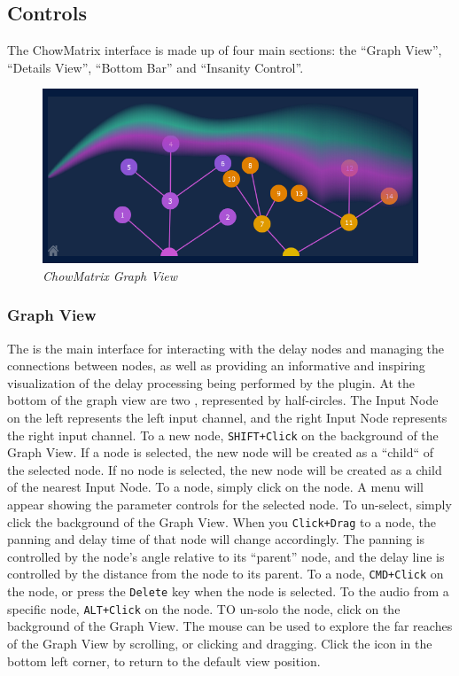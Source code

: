 \documentclass[landscape,twocolumn,a5paper]{manual}
\begin{document}
\subsection{Controls}
The ChowMatrix interface is made up of four main sections:
the ``Graph View'', ``Details View'', ``Bottom Bar''
and ``Insanity Control''.

\begin{figure}[ht]
    \center
    \includegraphics[width=0.8\columnwidth]{screenshots/GraphView.png}
    \caption{\label{fig:graph_view}{\it ChowMatrix Graph View}}
\end{figure}

\subsubsection{Graph View}
The  is the main interface for interacting
with the delay nodes and managing the connections between nodes,
as well as providing an informative and inspiring visualization
of the delay processing being performed by the plugin.
\newpar
At the bottom of the graph view are two ,
represented by half-circles. The Input Node on the left represents
the left input channel, and the right Input Node represents the right
input channel.
\newpar
To  a new node, \texttt{SHIFT+Click} on the
background of the Graph View. If a node is selected, the new
node will be created as a ``child`` of the selected node. If
no node is selected, the new node will be created as a child
of the nearest Input Node.
\newpar
To  a node, simply click on the node. A menu
will appear showing the parameter controls for the selected node.
To un-select, simply click the background of the Graph View.
\newpar
When you \texttt{Click+Drag} to  a node, the
panning and delay time of that node will change accordingly.
The panning is controlled by the node's angle relative to its
``parent'' node, and the delay line is controlled by the distance
from the node to its parent.
\newpar
To  a node, \texttt{CMD+Click} on the node,
or press the \texttt{Delete} key when the node is selected.
\newpar
To  the audio from a specific node,
\texttt{ALT+Click} on the node. TO un-solo the node,
click on the background of the Graph View.
\newpar
The mouse can be used to explore the far reaches of the
Graph View by scrolling, or clicking and dragging. Click
the  icon in the bottom left corner, to
return to the default view position.
\end{document}
